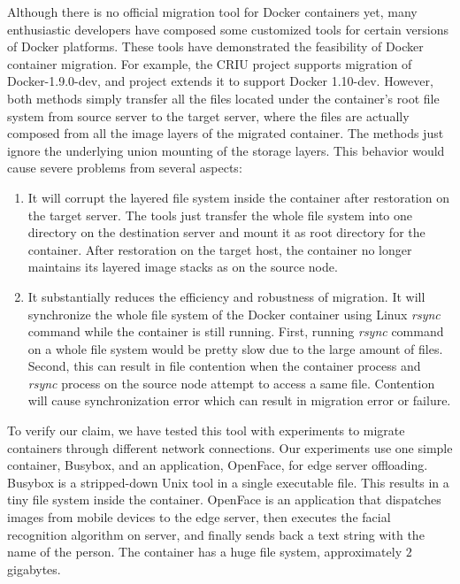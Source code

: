Although there is no official  migration tool for Docker containers yet, many enthusiastic developers have composed some customized tools for certain versions of Docker platforms. These tools have demonstrated the feasibility of Docker container  migration. For example, the CRIU project \cite{criu} supports migration of Docker-1.9.0-dev, and project \cite{boucherPhaul} 
 extends it to support Docker 1.10-dev. However, both methods simply transfer all the files located under the container's root file system from source server to the target server, where the files are actually composed from all the image layers of the migrated container. The methods just ignore the underlying union mounting of the storage layers.
This behavior would cause severe problems from several aspects:
\begin{enumerate}[series = tobecont]
    \item It will corrupt the layered file system inside the container after restoration  on the target server. The tools just transfer the whole file system into one directory on the destination server and mount it as root directory for the container. After restoration on the target host, the container no longer maintains its layered image stacks as on the source node. 
    \item It substantially reduces the efficiency and robustness of migration.
    It will synchronize the whole file system of the Docker container using Linux \textit{rsync} command while the container is still running. First, running \textit{rsync} command on a whole file system would be pretty slow due to the large amount of files.  Second, this can result in file contention when the container process and \textit{rsync} process on the source node attempt to access a same file. Contention will cause synchronization error which can result in migration error or failure. 
\end{enumerate}

To verify our claim, we have tested this tool with experiments to migrate containers through different network connections. Our experiments use one simple container, Busybox, and an application, OpenFace, for edge server offloading.  Busybox is a stripped-down Unix tool in a single executable file. This results in a tiny file system inside the container. OpenFace\cite{openface2016} is an application that dispatches images from mobile devices to the edge server, then executes the facial recognition algorithm on server, and finally sends back a text string with the name of the person. The container has a huge file system, approximately $2$ gigabytes.

